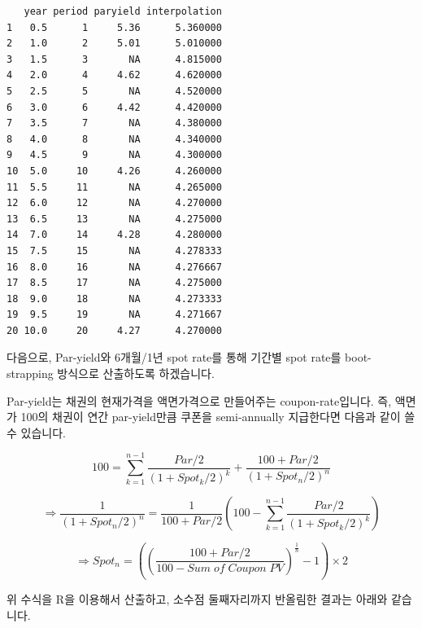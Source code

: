 \documentclass[
  a4paper,
  DIV=11,
  numbers=noendperiod]{scrreprt}
\begin{document}
\begin{verbatim}
   year period paryield interpolation
1   0.5      1     5.36      5.360000
2   1.0      2     5.01      5.010000
3   1.5      3       NA      4.815000
4   2.0      4     4.62      4.620000
5   2.5      5       NA      4.520000
6   3.0      6     4.42      4.420000
7   3.5      7       NA      4.380000
8   4.0      8       NA      4.340000
9   4.5      9       NA      4.300000
10  5.0     10     4.26      4.260000
11  5.5     11       NA      4.265000
12  6.0     12       NA      4.270000
13  6.5     13       NA      4.275000
14  7.0     14     4.28      4.280000
15  7.5     15       NA      4.278333
16  8.0     16       NA      4.276667
17  8.5     17       NA      4.275000
18  9.0     18       NA      4.273333
19  9.5     19       NA      4.271667
20 10.0     20     4.27      4.270000
\end{verbatim}

다음으로, Par-yield와 6개월/1년 spot rate를 통해 기간별 spot rate를
boot-strapping 방식으로 산출하도록 하겠습니다.

Par-yield는 채권의 현재가격을 액면가격으로 만들어주는 coupon-rate입니다.
즉, 액면가 100의 채권이 연간 par-yield만큼 쿠폰을 semi-annually
지급한다면 다음과 같이 쓸 수 있습니다.

\[100=\sum_{k=1}^{n-1}\frac{Par/2}{(1+Spot_k/2)^k}+\frac{100+Par/2}{(1+Spot_n/2)^n}\]

\[\Rightarrow \frac{1}{(1+Spot_n/2)^n}=\frac{1}{100+Par/2}(100-\sum_{k=1}^{n-1}\frac{Par/2}{(1+Spot_k/2)^k})\]

\[\Rightarrow Spot_n=((\frac{100+Par/2}{100-Sum\;of\;Coupon\;PV})^{\frac{1}{n}}-1)\times 2\]

위 수식을 R을 이용해서 산출하고, 소수점 둘째자리까지 반올림한 결과는
아래와 같습니다.
\end{document}
